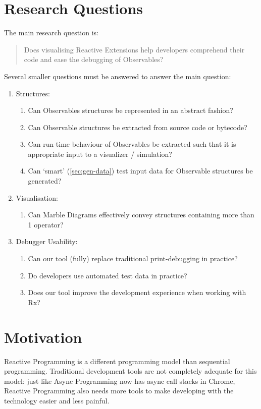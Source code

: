 \documentclass[11pt,a4paper]{article}
\begin{document}
\section{Research Questions}
\label{sec:questions}
The main research question is:

\begin{quotation}
	\noindent
	Does visualising Reactive Extensions help developers comprehend their code and ease the debugging of Observables?
\end{quotation}

\noindent 
Several smaller questions must be answered to answer the main question:

\begin{enumerate}
	
\item Structures:
\begin{enumerate}
	\item Can Observables structures be represented in an abstract fashion?
	\item Can Observable structures be extracted from source code or bytecode?
	\item Can run-time behaviour of Observables be extracted such that it is appropriate input to a visualizer / simulation?
	\item Can `smart' (\ref{sec:gen-data}) test input data for Observable structures be generated?
\end{enumerate}

\item Visualisation:
\begin{enumerate}
	\item Can Marble Diagrams effectively convey structures containing more than 1 operator?
\end{enumerate}

\item Debugger Usability:
\begin{enumerate}
	\item Can our tool (fully) replace traditional print-debugging in practice?
	\item Do developers use automated test data in practice?
	\item Does our tool improve the development experience when working with Rx?
\end{enumerate}

\end{enumerate}


\section{Motivation}
Reactive Programming is a different programming model than sequential programming. Traditional development tools are not completely adequate for this model: just like Async Programming now has async call stacks in Chrome, Reactive Programming also needs more tools to make developing with the technology easier and less painful. 
\end{document}
